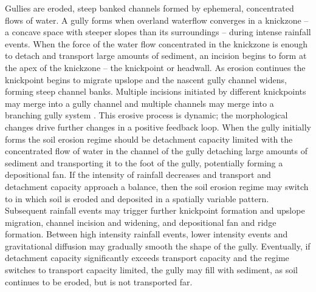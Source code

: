 \documentclass[gmd, manuscript]{copernicus}
\begin{document}
Gullies are eroded, steep banked channels 
formed by ephemeral, concentrated flows of water.
A gully forms when overland waterflow
converges in a knickzone
-- a concave space with steeper slopes than its surroundings 
\citep{Zahra2017} -- 
during intense rainfall events.  
When the force of the water flow concentrated in the knickzone
is enough to detach and transport large amounts of sediment,
an incision begins to form at the apex of the knickzone 
-- the knickpoint or headwall.
As erosion continues the knickpoint begins to migrate upslope
and the nascent gully channel widens,
forming steep channel banks. 
Multiple incisions initiated by different knickpoints 
may merge into a gully channel
and multiple channels may merge 
into a branching gully system \citep{Mitasova2013}. 
This erosive process is dynamic; 
the morphological changes drive further changes 
in a positive feedback loop.
When the gully initially forms 
the soil erosion regime should be detachment capacity limited
with the concentrated flow of water in the channel of the gully 
detaching large amounts of sediment 
and transporting it to the foot of the gully, 
potentially forming a depositional fan.
If the intensity of rainfall decreases
and transport and detachment capacity 
approach a balance, 
then the soil erosion regime may switch to 
in which soil is eroded and deposited 
in a spatially variable pattern.
Subsequent rainfall events may trigger further 
knickpoint formation and upslope migration, 
channel incision and widening, and
depositional fan and ridge formation. 
Between high intensity rainfall events, 
lower intensity events and gravitational diffusion
may gradually smooth the shape of the gully. 
Eventually, if detachment capacity 
significantly exceeds transport capacity
and the regime switches to transport capacity limited, 
the gully may fill with sediment,
as soil continues to be eroded, but is not transported far. 
\end{document}
